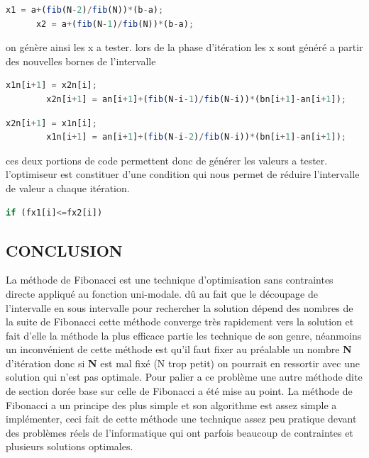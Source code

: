 \documentclass[a4paper,14pt]{article}
\begin{document}
\begin{lstlisting}[language=JavaScript]   
      x1 = a+(fib(N-2)/fib(N))*(b-a);
      x2 = a+(fib(N-1)/fib(N))*(b-a);
\end{lstlisting}
on génère ainsi les x a tester. lors de la phase d'itération les x sont généré a partir des nouvelles bornes de l'intervalle 
\begin{lstlisting}[language=JavaScript]   
        x1n[i+1] = x2n[i];
        x2n[i+1] = an[i+1]+(fib(N-i-1)/fib(N-i))*(bn[i+1]-an[i+1]);
\end{lstlisting}
\begin{lstlisting}[language=JavaScript]   
        x2n[i+1] = x1n[i];
        x1n[i+1] = an[i+1]+(fib(N-i-2)/fib(N-i))*(bn[i+1]-an[i+1]);
\end{lstlisting}
ces deux portions de code permettent donc de générer les valeurs a tester. l'optimiseur est constituer d'une condition qui nous permet de réduire l'intervalle de valeur a chaque itération.  
\begin{lstlisting}[language=JavaScript]   
        if (fx1[i]<=fx2[i])
\end{lstlisting}
\newpage


\begin{center}
\section*{CONCLUSION}
La méthode de Fibonacci est une technique d'optimisation sans contraintes directe appliqué au fonction uni-modale. dû au fait que le découpage de l'intervalle en sous intervalle pour rechercher la solution dépend des nombres de la suite de Fibonacci cette méthode converge très rapidement vers la solution et fait d'elle la méthode la plus efficace partie les technique de son genre, néanmoins un inconvénient de cette méthode est qu'il faut fixer au préalable un nombre \textbf{N} d'itération donc si \textbf{N} est mal fixé (N trop petit) on pourrait en ressortir avec une solution qui n'est pas optimale. Pour palier a ce problème une autre méthode dite de section dorée base sur celle de Fibonacci a été mise au point. La méthode de Fibonacci a un principe des plus simple et son algorithme est assez simple a implémenter, ceci fait de cette méthode une technique assez peu pratique devant des problèmes réels de l'informatique qui ont parfois beaucoup de contraintes et plusieurs solutions optimales. 
\end{center}
\end{document}
